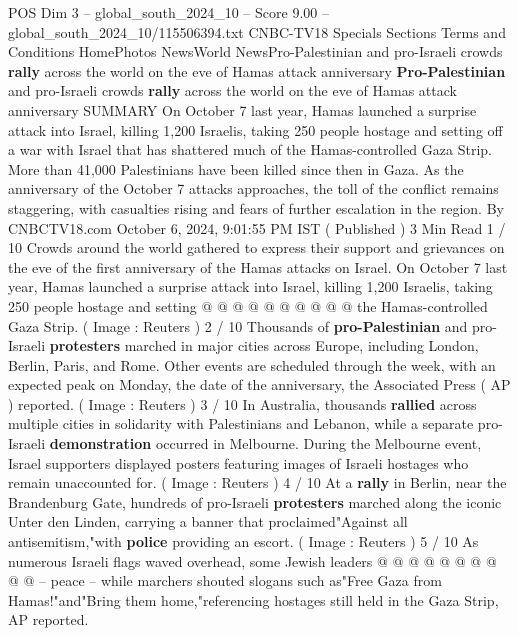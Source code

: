 \begin{textsample}{POS Dim 3 – global\_south\_2024\_10 – Score 9.00 – global\_south\_2024\_10/115506394.txt}  \label{ex:f3_pos_366}
CNBC-TV18 Specials Sections Terms and Conditions HomePhotos NewsWorld NewsPro-Palestinian and pro-Israeli crowds \textbf{rally} across the world on the eve of Hamas attack anniversary \textbf{Pro-Palestinian} and pro-Israeli crowds \textbf{rally} across the world on the eve of Hamas attack anniversary SUMMARY On October 7 last year, Hamas launched a surprise attack into Israel, killing 1,200 Israelis, taking 250 people hostage and setting off a war with Israel that has shattered much of the Hamas-controlled Gaza Strip.
More than 41,000 Palestinians have been killed since then in Gaza.
As the anniversary of the October 7 attacks approaches, the toll of the conflict remains staggering, with casualties rising and fears of further escalation in the region.
By CNBCTV18.com October 6, 2024, 9:01:55 PM IST ( Published ) 3 Min Read 1 / 10 Crowds around the world gathered to express their support and grievances on the eve of the first anniversary of the Hamas attacks on Israel.
On October 7 last year, Hamas launched a surprise attack into Israel, killing 1,200 Israelis, taking 250 people hostage and setting @ @ @ @ @ @ @ @ @ @ the Hamas-controlled Gaza Strip. ( Image : Reuters ) 2 / 10 Thousands of \textbf{pro-Palestinian} and pro-Israeli \textbf{protesters} marched in major cities across Europe, including London, Berlin, Paris, and Rome.
Other events are scheduled through the week, with an expected peak on Monday, the date of the anniversary, the Associated Press ( AP ) reported. ( Image : Reuters ) 3 / 10 In Australia, thousands \textbf{rallied} across multiple cities in solidarity with Palestinians and Lebanon, while a separate pro-Israeli \textbf{demonstration} occurred in Melbourne.
During the Melbourne event, Israel supporters displayed posters featuring images of Israeli hostages who remain unaccounted for. ( Image : Reuters ) 4 / 10 At a \textbf{rally} in Berlin, near the Brandenburg Gate, hundreds of pro-Israeli \textbf{protesters} marched along the iconic Unter den Linden, carrying a banner that proclaimed"Against all antisemitism,"with \textbf{police} providing an escort. ( Image : Reuters ) 5 / 10 As numerous Israeli flags waved overhead, some Jewish leaders @ @ @ @ @ @ @ @ @ @ -- peace -- while marchers shouted slogans such as"Free Gaza from Hamas!"and"Bring them home,"referencing hostages still held in the Gaza Strip, AP reported.

\end{textsample}
